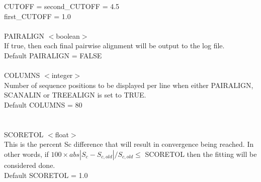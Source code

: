  CUTOFF = second\_CUTOFF = 4.5\\
 first\_CUTOFF = 1.0\\
\\
PAIRALIGN $<$boolean$>$\\
If true, then each final pairwise alignment will be output to the
log file.\\
Default PAIRALIGN = FALSE\\
\\
COLUMNS $<$integer$>$\\
Number of sequence positions to be displayed per line when either
PAIRALIGN, SCANALIN or TREEALIGN is set to TRUE.\\
Default COLUMNS = 80\\
\\
\\
SCORETOL $<$float$>$ \\
This is the percent Sc difference that will result in convergence
being reached.  In other words, if $100 \times abs | S_{c} - S_{c,old} |/S_{c,old} \leq$ SCORETOL then
the fitting will be considered done.\\
Default SCORETOL = 1.0\\
\\

